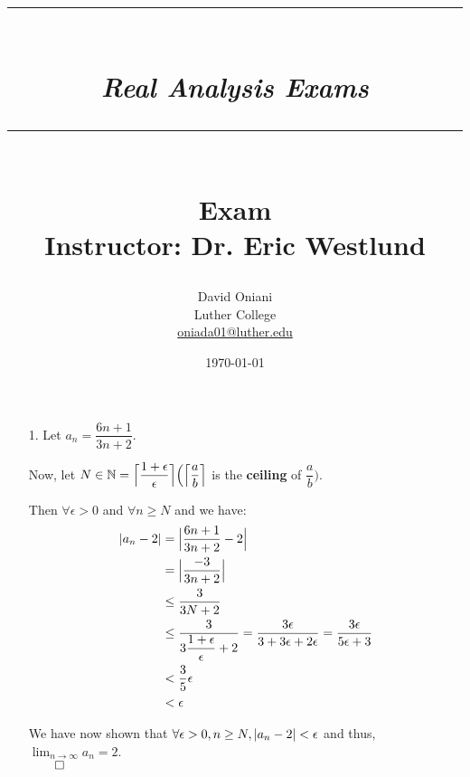 \documentclass[11pt]{article}
\author{David Oniani\\
        Luther College\\
        \href{mailto:oniada01@luther.edu}{oniada01@luther.edu}}
\title{\rule{\paperwidth - 150pt}{1pt}\textbf{\\\textit{Real Analysis
Exams}\\}\rule {\paperwidth - 150pt}{1pt}\\\textbf{Exam
\textnumero1}\\{\normalsize Instructor: Dr. Eric Westlund}}
\date{\today}
\DeclarePairedDelimiter\abs{\lvert}{\rvert}%
\DeclarePairedDelimiter\absb{\Big\lvert}{\Big\rvert}%
\DeclarePairedDelimiter{\ceilb}{\Big\lceil}{\Big\rceil}
\newcommand{\nats}{\mathbb{N}}
\begin{document}
\maketitle


\begin{itemize}
    \item[1.]
        Let $a_n = \dfrac{6n + 1}{3n + 2}$.

        Now, let $N \in \nats = \ceilb{\dfrac{1 + \epsilon}{\epsilon}}
        \Big(\ceilb{\dfrac{a}{b}}$ is the \textbf{ceiling} of
        $\dfrac{a}{b}\Big)$.

        Then $\forall \epsilon > 0$ and $\forall n \geq N$ and we have:
        \begin{align*}
            \abs{a_n - 2} &= \absb{\dfrac{6n + 1}{3n + 2} - 2}\\
                          &= \absb{\dfrac{-3}{3n + 2}}\\
                          &\leq \dfrac{3}{3N + 2}\\
                          &\leq \dfrac{3}{3\dfrac{1 + \epsilon}{\epsilon} + 2}
                               = \dfrac{3\epsilon}{3 + 3\epsilon + 2\epsilon}
                               = \dfrac{3\epsilon}{5\epsilon + 3}\\
                          &< \dfrac{3}{5}\epsilon\\
                          &< \epsilon
        \end{align*}

        We have now shown that $\forall \epsilon > 0, n \geq N, \abs{a_n - 2}
        < \epsilon$ and thus, $\displaystyle\lim_{n \to \infty} a_n = 2$.\\
        $\qed$


\end{itemize}
\end{document}
